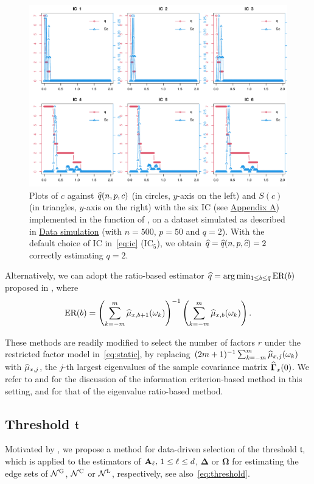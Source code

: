 \begin{figure}[htb]
\centering
\includegraphics[width = .6\textwidth]{figs/IC.pdf}
\caption{Plots of $c$ against $\widehat q(n, p, c)$ (in circles, $y$-axis on the left) and $S(c)$ (in triangles, $y$-axis on the right) with the six IC (see \hyperref[sec:factornumber]{Appendix A}) implemented in the function  of , on a dataset simulated as described in \hyperref[sec:package:data]{Data simulation} (with $n = 500$, $p = 50$ and $q = 2$).
With the default choice of IC in~\eqref{eq:ic} (IC$_5$), we obtain $\widehat q = \widehat q(n, p, \widehat c) = 2$ correctly estimating $q = 2$.}
\label{fig:qplot}
\end{figure}

Alternatively, we can adopt the ratio-based estimator $\widehat q = \arg\min_{1 \le b \le \bar{q}} \text{ER}(b)$ proposed in \cite{avarucci2022main}, where 
\begin{align}
\label{eq:er}
\text{ER}(b) = \left( \sum_{k = -m}^m \widehat{\mu}_{x, b + 1}(\omega_k) \right)^{-1} \left( \sum_{k = -m}^m \widehat{\mu}_{x, b}(\omega_k) \right).
\end{align}

These methods are readily modified to select the number of factors $r$ under the restricted factor model in~\eqref{eq:static}, by replacing $(2m + 1)^{-1} \sum_{k = -m}^m \widehat{\mu}_{x, j}(\omega_k)$ with $\widehat\mu_{x, j}$, the $j$-th largest eigenvalues of the sample covariance matrix $\widehat{\bm\Gamma}_x(0)$.
We refer to \cite{bai2002} and \cite{alessi2010improved} for the discussion of the information criterion-based method in this setting, and \cite{ahn2013eigenvalue} for that of the eigenvalue ratio-based method.

\subsection{Threshold $\mathfrak{t}$}
\label{sec:tuning:thresh}

Motivated by \cite{liu2021simultaneous}, we propose a method for data-driven selection of the threshold $\mathfrak{t}$,
which is applied to the estimators of $\mathbf A_\ell, \, 1 \le \ell \le d$, $\bm\Delta$ or $\bm\Omega$ for estimating the edge sets of $\mathcal N^{\text{\upshape{G}}}$, $\mathcal N^{\text{\upshape{C}}}$ or $\mathcal N^{\text{\upshape{L}}}$, respectively, see also~\eqref{eq:threshold}.

